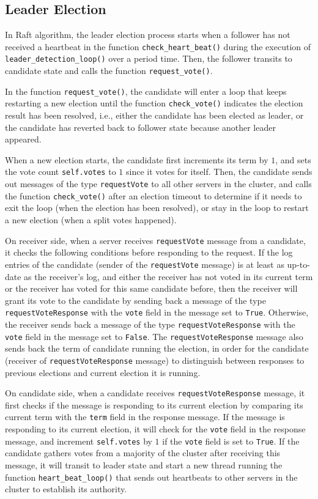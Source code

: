 \documentclass[11pt]{article}
\begin{document}
\subsection{Leader Election}

In Raft algorithm, the leader election process starts when a follower has not received a heartbeat in the function \texttt{check\_heart\_beat()} during the execution of \texttt{leader\_detection\_loop()} over a period time. Then, the follower transits to candidate state and calls the function \texttt{request\_vote()}.

In the function \texttt{request\_vote()}, the candidate will enter a loop that keeps restarting a new election until the function \texttt{check\_vote()} indicates the election result has been resolved, i.e., either the candidate has been elected as leader, or the candidate has reverted back to follower state because another leader appeared.

When a new election starts, the candidate first increments its term by $1$, and sets the vote count \texttt{self.votes} to $1$ since it votes for itself. Then, the candidate sends out messages of the type \texttt{requestVote} to all other servers in the cluster, and calls the function \texttt{check\_vote()} after an election timeout to determine if it needs to exit the loop (when the election has been resolved), or stay in the loop to restart a new election (when a split votes happened).

On receiver side, when a server receives \texttt{requestVote} message from a candidate, it checks the following conditions before responding to the request. If the log entries of the candidate (sender of the \texttt{requestVote} message) is at least as up-to-date as the receiver's log, and either the receiver has not voted in its current term or the receiver has voted for this same candidate before, then the receiver will grant its vote to the candidate by sending back a message of the type \texttt{requestVoteResponse} with the \texttt{vote} field in the message set to \texttt{True}. Otherwise, the receiver sends back a message of the type \texttt{requestVoteResponse} with the \texttt{vote} field in the message set to \texttt{False}. The \texttt{requestVoteResponse} message also sends back the term of candidate running the election, in order for the candidate (receiver of \texttt{requestVoteResponse} message) to distinguish between responses to previous elections and current election it is running.

On candidate side, when a candidate receives \texttt{requestVoteResponse} message, it first checks if the message is responding to its current election by comparing its current term with the \texttt{term} field in the response message. If the message is responding to its current election, it will check for the \texttt{vote} field in the response message, and increment \texttt{self.votes} by $1$ if the \texttt{vote} field is set to \texttt{True}. If the candidate gathers votes from a majority of the cluster after receiving this message, it will transit to leader state and start a new thread running the function \texttt{heart\_beat\_loop()} that sends out heartbeats to other servers in the cluster to establish its authority.
\end{document}
